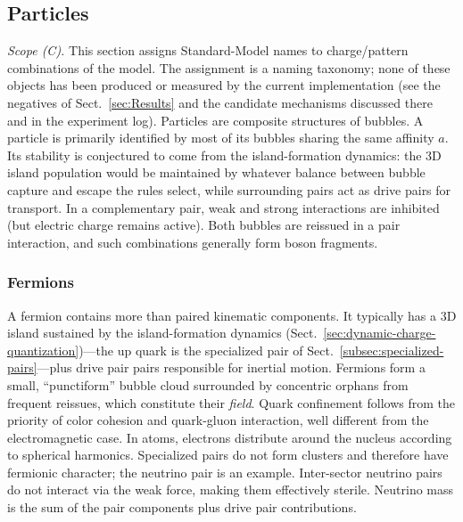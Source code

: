 \documentclass{ijuc}
\begin{document}
\subsection{Particles}\label{sec:Particles}
\emph{Scope (C).} This section assigns Standard-Model names to charge/pattern combinations of the model.  The assignment is a naming taxonomy; none of these objects has been produced or measured by the current implementation (see the negatives of Sect.~\ref{sec:Results} and the candidate mechanisms discussed there and in the experiment log).
Particles are composite structures of bubbles. A particle is primarily identified by most of its bubbles sharing the same affinity $a$. Its stability is conjectured to come from the island-formation dynamics: the 3D island population would be maintained by whatever balance between bubble capture and escape the rules select, while surrounding pairs act as drive pairs for transport.
In a complementary pair, weak and strong interactions are inhibited (but electric charge remains active). Both bubbles are reissued in a pair interaction, and such combinations generally form boson fragments.
\subsubsection{Fermions}
A fermion contains more than paired kinematic components. It typically has a 3D island sustained by the island-formation dynamics (Sect.~\ref{sec:dynamic-charge-quantization})---the up quark is the specialized pair of Sect.~\ref{subsec:specialized-pairs}---plus drive pair pairs responsible for inertial motion. Fermions form a small, ``punctiform'' bubble cloud surrounded by concentric orphans from frequent reissues, which constitute their \textit{field}.
Quark confinement follows from the priority of color cohesion and quark-gluon interaction, well different from the electromagnetic case. In atoms, electrons distribute around the nucleus according to spherical harmonics.
Specialized pairs do not form clusters and therefore have fermionic character; the neutrino pair is an example. Inter-sector neutrino pairs do not interact via the weak force, making them effectively sterile. Neutrino mass is the sum of the pair components plus drive pair contributions.
\end{document}
